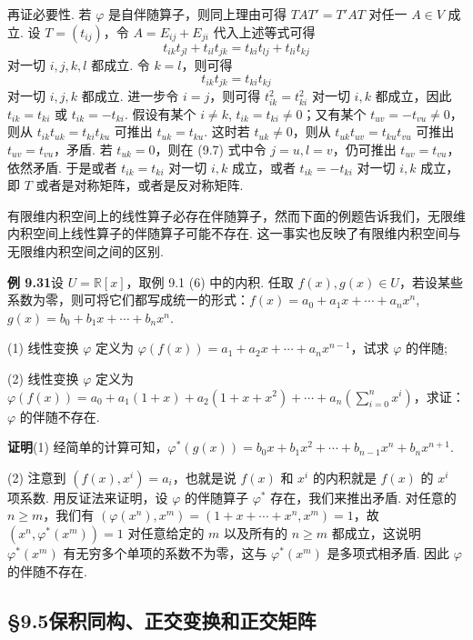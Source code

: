 \documentclass[UTF8,12pt,a4paper,fontset=fandol]{ctexart}
\begin{document}
再证必要性. 若 $\varphi$ 是自伴随算子，则同上理由可得 $TAT'=T'AT$ 对任一 $A\in V$ 成立. 设 $T=(t_{ij})$，令 $A=E_{ij}+E_{ji}$ 代入上述等式可得
\begin{equation}
t_{ik}t_{jl}+t_{il}t_{jk}=t_{ki}t_{lj}+t_{li}t_{kj}
\tag{9.7}
\end{equation}
对一切 $i,j,k,l$ 都成立. 令 $k=l$，则可得
\[
t_{ik}t_{jk}=t_{ki}t_{kj}
\]
对一切 $i,j,k$ 都成立. 进一步令 $i=j$，则可得 $t_{ik}^2=t_{ki}^2$ 对一切 $i,k$ 都成立，因此 $t_{ik}=t_{ki}$ 或 $t_{ik}=-t_{ki}$. 假设有某个 $i\ne k$, $t_{ik}=t_{ki}\ne 0$；又有某个 $t_{uv}=-t_{vu}\ne 0$，则从 $t_{ik}t_{uk}=t_{ki}t_{ku}$ 可推出 $t_{uk}=t_{ku}$. 这时若 $t_{uk}\ne 0$，则从 $t_{uk}t_{uv}=t_{ku}t_{vu}$ 可推出 $t_{uv}=t_{vu}$，矛盾. 若 $t_{uk}=0$，则在 (9.7) 式中令 $j=u,l=v$，仍可推出 $t_{uv}=t_{vu}$，依然矛盾. 于是或者 $t_{ik}=t_{ki}$ 对一切 $i,k$ 成立，或者 $t_{ik}=-t_{ki}$ 对一切 $i,k$ 成立，即 $T$ 或者是对称矩阵，或者是反对称矩阵.

有限维内积空间上的线性算子必存在伴随算子，然而下面的例题告诉我们，无限维内积空间上线性算子的伴随算子可能不存在. 这一事实也反映了有限维内积空间与无限维内积空间之间的区别.

\noindent\textbf{例 9.31}\quad 设 $U=\mathbb{R}[x]$，取例 9.1 (6) 中的内积. 任取 $f(x),g(x)\in U$，若设某些系数为零，则可将它们都写成统一的形式：$f(x)=a_0+a_1x+\cdots+a_nx^n$, $g(x)=b_0+b_1x+\cdots+b_nx^n$.

(1) 线性变换 $\varphi$ 定义为 $\varphi(f(x))=a_1+a_2x+\cdots+a_nx^{n-1}$，试求 $\varphi$ 的伴随;

(2) 线性变换 $\varphi$ 定义为 $\varphi(f(x))=a_0+a_1(1+x)+a_2(1+x+x^2)+\cdots+a_n\left(\sum_{i=0}^n x^i\right)$，求证：$\varphi$ 的伴随不存在.

\noindent\textbf{证明}\quad (1) 经简单的计算可知，$\varphi^*(g(x))=b_0x+b_1x^2+\cdots+b_{n-1}x^n+b_nx^{n+1}$.

(2) 注意到 $(f(x),x^i)=a_i$，也就是说 $f(x)$ 和 $x^i$ 的内积就是 $f(x)$ 的 $x^i$ 项系数. 用反证法来证明，设 $\varphi$ 的伴随算子 $\varphi^*$ 存在，我们来推出矛盾. 对任意的 $n\ge m$，我们有 $(\varphi(x^n),x^m)=(1+x+\cdots+x^n,x^m)=1$，故 $(x^n,\varphi^*(x^m))=1$ 对任意给定的 $m$ 以及所有的 $n\ge m$ 都成立，这说明 $\varphi^*(x^m)$ 有无穷多个单项的系数不为零，这与 $\varphi^*(x^m)$ 是多项式相矛盾. 因此 $\varphi$ 的伴随不存在.

\subsection*{§9.5\quad 保积同构、正交变换和正交矩阵}
\end{document}
